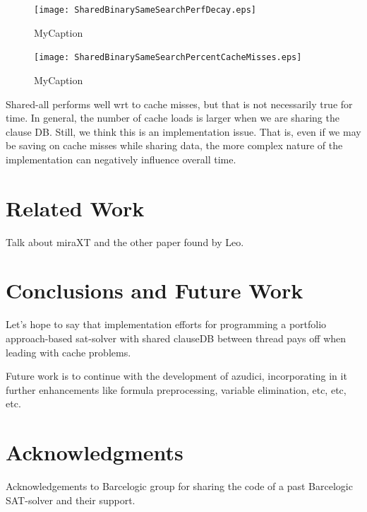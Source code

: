 \documentclass{llncs}
\begin{document}
\begin{minipage}[h]{.5\linewidth}
  \begin{figure}[htp]
    \centering
    \texttt{[image: SharedBinarySameSearchPerfDecay.eps]}
    \caption{MyCaption}
    \label{fig:MyLabel}
  \end{figure}
  \begin{figure}[htp]
    \centering
    \texttt{[image: SharedBinarySameSearchPercentCacheMisses.eps]}
    \caption{MyCaption}
    \label{fig:MyLabel}
  \end{figure}
\end{minipage}

Shared-all performs well wrt to cache misses, but that is not
necessarily true for time. In general, the number of cache loads is
larger when we are sharing the clause DB. Still, we think this is an
implementation issue. That is, even if we may be saving on cache
misses while sharing data, the more complex nature of the
implementation can negatively influence overall time.



\section{Related Work}

Talk about miraXT and the other paper found by Leo.

\section{Conclusions and Future Work}

Let's hope to say that implementation efforts for programming a
portfolio approach-based sat-solver with shared clauseDB between
thread pays off when leading with cache problems.

Future work is to continue with the development of  azudici,
incorporating in it further enhancements like formula preprocessing,
variable elimination, etc, etc, etc.

\section*{Acknowledgments}

Acknowledgements to Barcelogic group for sharing the code of a past
Barcelogic SAT-solver and their support.




\end{document}
